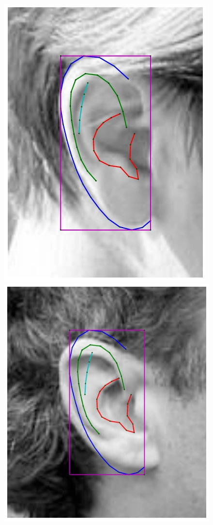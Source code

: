 \begin{figure}[!t]
    \includegraphics[height=\flowhh]{resources/Ear_Deformable_Model/fittings/initial_0023}
    \includegraphics[height=\flowhh]{resources/Ear_Deformable_Model/fittings/initial_0015}

\end{figure}
